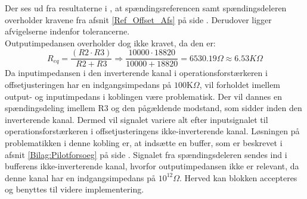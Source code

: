 Der ses ud fra resultaterne i , at spændingsreferencen samt spændingsdeleren overholder kravene fra afsnit \ref{Ref_Offset_Afs} på side \pageref{Ref_Offset_Afs}. Derudover ligger afvigelserne indenfor tolerancerne. \\
Outputimpedansen overholder dog ikke kravet, da den er:
\begin{equation}
R_{eq} = \dfrac{(R2 \cdot R3)}{R2 + R3} \Longrightarrow \dfrac{10000 \cdot 18820}{10000 + 18820} = 6530.19\Omega \approx 6.53K\Omega
\end{equation}
Da inputimpedansen i den inverterende kanal i operationsforstærkeren i offsetjusteringen har en indgangsimpedans på $100$K$\Omega$, vil forholdet imellem output- og inputimpedans i koblingen være problematisk. Der vil dannes en spændingsdeling imellem R$3$ og den pågældende modstand, som sidder inden den inverterende kanal. Dermed vil signalet variere alt efter inputsignalet til operationsforstærkeren i offsetjusteringens ikke-inverterende kanal. Løsningen på problematikken i denne kobling er, at indsætte en buffer, som er beskrevet i afsnit \ref{Bilag:Pilotforsoeg} på side \pageref{Bilag:Pilotforsoeg}. Signalet fra spændingsdeleren sendes ind i bufferens ikke-inverterende kanal, hvorfor outputimpedansen ikke er relevant, da denne kanal har en indgangsimpedans på $10^{12}\Omega$. Herved kan blokken accepteres og benyttes til videre implementering.